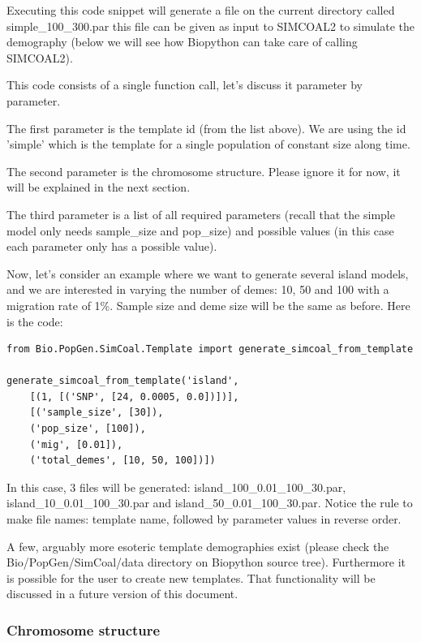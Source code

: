 \documentclass{report}
\begin{document}
Executing this code snippet will generate a file on the current directory called
simple\_100\_300.par this file can be given as input to SIMCOAL2 to simulate the
demography (below we will see how Biopython can take care of calling SIMCOAL2).

This code consists of a single function call, let's discuss it parameter by parameter.

The first parameter is the template id (from the list above). We are using the id
'simple' which is the template for a single population of constant size along time.

The second parameter is the chromosome structure. Please ignore it for now, it will be
explained in the next section.

The third parameter is a list of all required parameters (recall that the simple model
only needs sample\_size and pop\_size) and possible values (in this case each
parameter only has a possible value).

Now, let's consider an example where we want to generate several island models, and we
are interested in varying the number of demes: 10, 50 and 100 with a migration
rate of 1\%. Sample size and deme
size will be the same as before. Here is the code:


\begin{verbatim}
from Bio.PopGen.SimCoal.Template import generate_simcoal_from_template

generate_simcoal_from_template('island',
    [(1, [('SNP', [24, 0.0005, 0.0])])],
    [('sample_size', [30]),
    ('pop_size', [100]),
    ('mig', [0.01]),
    ('total_demes', [10, 50, 100])])
\end{verbatim}

In this case, 3 files will be generated: island\_100\_0.01\_100\_30.par,
island\_10\_0.01\_100\_30.par and island\_50\_0.01\_100\_30.par. Notice the
rule to make file names: template name, followed by parameter values in
reverse order.

A few, arguably more esoteric template demographies exist (please check the
Bio/PopGen/SimCoal/data directory on Biopython source tree). Furthermore it is possible
for the user to create new templates. That functionality will be discussed in a future
version of this document.

\subsubsection{Chromosome structure}
\end{document}
